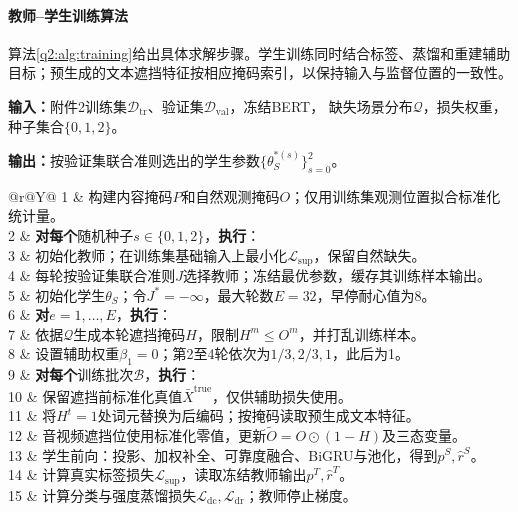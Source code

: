\paragraph{教师--学生训练算法}
算法\ref{q2:alg:training}给出具体求解步骤。学生训练同时结合标签、蒸馏和重建辅助目标；预生成的文本遮挡特征按相应掩码索引，以保持输入与监督位置的一致性。
\begin{algorithm}[H]
\caption{TSRF-D教师--学生联合训练}\label{q2:alg:training}
\small
\textbf{输入：}附件2训练集$\mathcal D_{\mathrm{tr}}$、验证集$\mathcal D_{\mathrm{val}}$，冻结BERT，
缺失场景分布$\mathcal Q$，损失权重，种子集合$\{0,1,2\}$。\par
\textbf{输出：}按验证集联合准则选出的学生参数$\{\theta_S^{*(s)}\}_{s=0}^{2}$。\par
\medskip\noindent
\begin{tabularx}{\linewidth}{@{}r@{\quad}Y@{}}
1 & 构建内容掩码$P$和自然观测掩码$O$；仅用训练集观测位置拟合标准化统计量。\\
2 & \textbf{对每个}随机种子$s\in\{0,1,2\}$，\textbf{执行}：\\
3 & \quad 初始化教师；在训练集基础输入上最小化$\mathcal L_{\mathrm{sup}}$，保留自然缺失。\\
4 & \quad 每轮按验证集联合准则$J$选择教师；冻结最优参数，缓存其训练样本输出。\\
5 & \quad 初始化学生$\theta_S$；令$J^*=-\infty$，最大轮数$E=32$，早停耐心值为8。\\
6 & \quad \textbf{对}$e=1,\ldots,E$，\textbf{执行}：\\
7 & \qquad 依据$\mathcal Q$生成本轮遮挡掩码$H$，限制$H^m\le O^m$，并打乱训练样本。\\
8 & \qquad 设置辅助权重$\beta_1=0$；第2至4轮依次为$1/3,2/3,1$，此后为1。\\
9 & \qquad \textbf{对每个}训练批次$\mathcal B$，\textbf{执行}：\\
10 & \qquad\quad 保留遮挡前标准化真值$\bar X^{\mathrm{true}}$，仅供辅助损失使用。\\
11 & \qquad\quad 将$H^t=1$处词元替换为\file{[UNK]}后编码；按掩码读取预生成文本特征。\\
12 & \qquad\quad 音视频遮挡位使用标准化零值，更新$\widetilde O=O\odot(1-H)$及三态变量。\\
13 & \qquad\quad 学生前向：投影、加权补全、可靠度融合、BiGRU与池化，得到$p^S,\hat r^S$。\\
14 & \qquad\quad 计算真实标签损失$\mathcal L_{\mathrm{sup}}$，读取冻结教师输出$p^T,\hat r^T$。\\
15 & \qquad\quad 计算分类与强度蒸馏损失$\mathcal L_{\mathrm{dc}},\mathcal L_{\mathrm{dr}}$；教师停止梯度。\\

\end{tabularx}
\end{algorithm}
